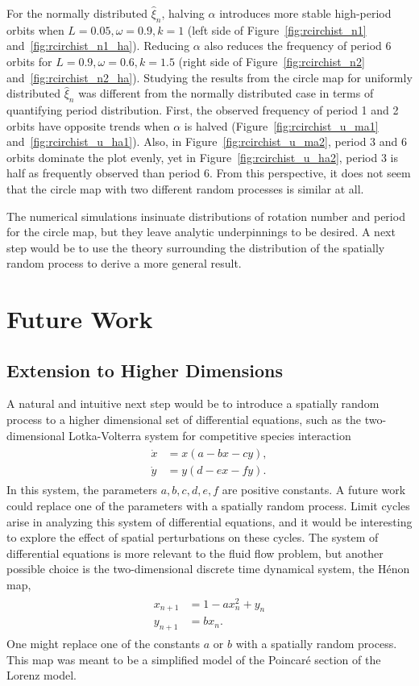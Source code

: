 For the normally distributed $\hat{\xi}_n$, halving
$\alpha$ introduces more stable high-period orbits when
$L=0.05,\omega=0.9,k=1$ (left side of Figure~\ref{fig:rcirchist_n1} and~\ref{fig:rcirchist_n1_ha}). Reducing
$\alpha$ also reduces the frequency of period 6 orbits for
$L=0.9,\omega=0.6,k=1.5$ (right side of Figure~\ref{fig:rcirchist_n2}
and~\ref{fig:rcirchist_n2_ha}). Studying the results from the circle
map for uniformly distributed
$\hat{\xi}_n$ was different from the normally distributed case in
terms of quantifying period distribution. First,
the observed frequency of period 1 and 2 orbits have opposite trends when $\alpha$ is
halved (Figure~\ref{fig:rcirchist_u_ma1}
and~\ref{fig:rcirchist_u_ha1}). Also, in Figure~\ref{fig:rcirchist_u_ma2},
period 3 and 6 orbits dominate the plot evenly, yet in
Figure~\ref{fig:rcirchist_u_ha2}, period 3 is half as frequently observed than
period 6. From this perspective, it does not seem that the circle map
with two different random processes is similar at all.

The numerical simulations insinuate distributions of
rotation number and period for the circle map, but they leave analytic
underpinnings to be desired. A next step would be to use the theory
surrounding the distribution of the spatially random process to derive
a more general result.
\section{Future Work}
\subsection{Extension to Higher Dimensions}
A natural and intuitive next step would be to introduce a spatially
random process to a higher dimensional set of differential equations, such as the
two-dimensional Lotka-Volterra
system for competitive species interaction
\begin{align}
\begin{split}
\dot{x} &= x(a-bx-cy),\\
\dot{y} &= y(d-ex-fy).
\end{split}
\end{align}
In this system, the parameters $a,b,c,d,e,f$ are positive
constants. A
future work could replace one of the parameters with a spatially
random process. Limit cycles arise in analyzing this system of
differential equations, and it would be interesting to explore the
effect of spatial perturbations on these cycles. The system of differential equations is more relevant to
the fluid flow problem, but another possible
choice is the two-dimensional discrete time dynamical system, the H\'{e}non map,
\begin{align}
\begin{split}
x_{n+1}&=1-ax_n^2+y_n\\
y_{n+1}&=bx_n.
\end{split}
\end{align}
One might replace one of the constants $a$ or $b$ with a spatially random
process. This map was meant to be a simplified model of the
Poincar\'{e} section of the Lorenz model. 
